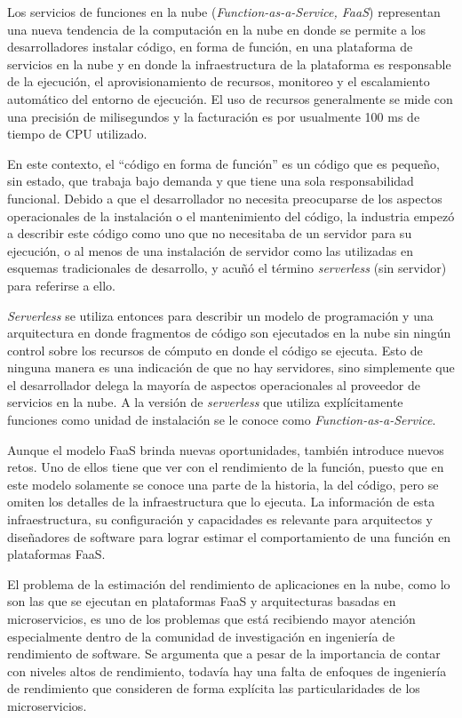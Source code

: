 Los servicios de funciones en la nube (\textit{Function-as-a-Service, FaaS}) representan una nueva tendencia de la computación en la nube en donde se permite a los desarrolladores instalar código, en forma de función, en una plataforma de servicios en la nube y en donde la infraestructura de la plataforma es responsable de la ejecución, el aprovisionamiento de recursos, monitoreo y el escalamiento automático del entorno de ejecución. El uso de recursos generalmente se mide con una precisión de milisegundos y la facturación es por usualmente 100 ms de tiempo de CPU utilizado. 

En este contexto, el ``código en forma de función'' es un código que es pequeño, sin estado, que trabaja bajo demanda y que tiene una sola responsabilidad funcional. Debido a que el desarrollador no necesita preocuparse de los aspectos operacionales de la instalación o el mantenimiento del código, la industria empezó a describir este código como uno que no necesitaba de un servidor para su ejecución, o al menos de una instalación de servidor como las utilizadas en esquemas tradicionales de desarrollo, y acuñó el término \textit{serverless} (sin servidor) para referirse a ello. 

\textit{Serverless} se utiliza entonces para describir un modelo de programación y una arquitectura en donde fragmentos de código son ejecutados en la nube sin ningún control sobre los recursos de cómputo en donde el código se ejecuta. Esto de ninguna manera es una indicación de que no hay servidores, sino simplemente que el desarrollador delega la mayoría de aspectos operacionales al proveedor de servicios en la nube. A la versión de \textit{serverless} que utiliza explícitamente funciones como unidad de instalación se le conoce como \textit{Function-as-a-Service}\cite{DBLP:journals/corr/BaldiniCCCFIMMR17}.

Aunque el modelo FaaS brinda nuevas oportunidades, también introduce nuevos retos. Uno de ellos tiene que ver con el rendimiento de la función, puesto que en este modelo solamente se conoce una parte de la historia, la del código, pero se omiten los detalles de la infraestructura que lo ejecuta. La información de esta infraestructura, su configuración y capacidades es relevante para arquitectos y diseñadores de software para lograr estimar el comportamiento de una función en plataformas FaaS. 

El problema de la estimación del rendimiento de aplicaciones en la nube, como lo son las que se ejecutan en plataformas FaaS y arquitecturas basadas en microservicios, es uno de los problemas que  está recibiendo mayor atención especialmente dentro de la comunidad de investigación en ingeniería de rendimiento de software. Se argumenta que a pesar de la importancia de contar con niveles altos de rendimiento, todavía hay una falta de enfoques de ingeniería de rendimiento que consideren de forma explícita las particularidades de los microservicios\cite{Heinrich:2017:PEM:3053600.3053653}.

